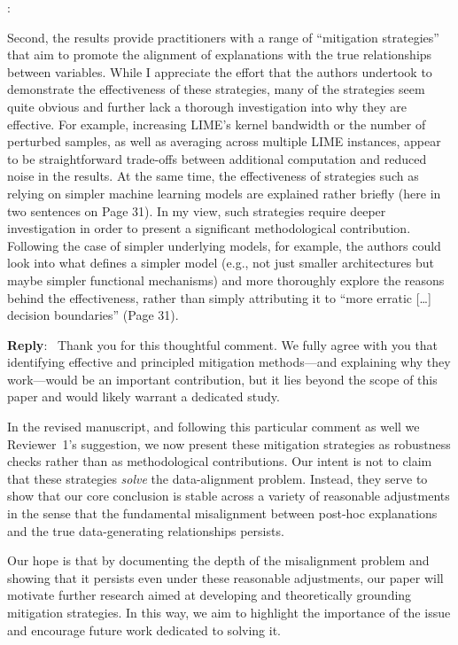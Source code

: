 \documentclass[11pt]{article}
\newcounter{se}[section]
\newcounter{reviewer}
\newcounter{point}[reviewer]
\renewcommand{\thepoint}{R\,\thereviewer.\arabic{point}}
\newenvironment{point}{
    \refstepcounter{point} \bigskip \noindent {\textbf{\thepoint}}: \rmfamily \itshape
}{\medskip}
\newenvironment{reply}
 {\par\medskip \noindent \begin{sf}\textbf{Reply}:\ }
 {\medskip \end{sf}}
\begin{document}
\begin{point}
Second, the results provide practitioners with a range of “mitigation strategies” that aim to promote the alignment of explanations with the true relationships between variables. While I appreciate the effort that the authors undertook to demonstrate the effectiveness of these strategies, many of the strategies seem quite obvious and further lack a thorough investigation into why they are effective. For example, increasing LIME’s kernel bandwidth or the number of perturbed samples, as well as averaging across multiple LIME instances, appear to be straightforward trade-offs between additional computation and reduced noise in the results. At the same time, the effectiveness of strategies such as relying on simpler machine learning models are explained rather briefly (here in two sentences on Page 31). In my view, such strategies require deeper investigation in order to present a significant methodological contribution. Following the case of simpler underlying models, for example, the authors could look into what defines a simpler model (e.g., not just smaller architectures but maybe simpler functional mechanisms) and more thoroughly explore the reasons behind the effectiveness, rather than simply attributing it to “more erratic […] decision boundaries” (Page 31). 
\end{point}

\begin{reply}
Thank you for this thoughtful comment.  We fully agree with you  that identifying effective and principled mitigation methods—and explaining why they work—would be an important contribution, but it lies beyond the scope of this paper and would likely warrant a dedicated study. 

In the revised manuscript, and following this particular comment as well we Reviewer~1’s suggestion, we now present these mitigation strategies as robustness checks rather than as methodological contributions. Our intent is not to claim that these strategies \emph{solve} the data-alignment problem. Instead, they serve to show that our core conclusion is stable across a variety of reasonable adjustments in the sense that the fundamental misalignment between post-hoc explanations and the true data-generating relationships persists.



Our hope is that by documenting the depth of the misalignment problem and showing that it persists even under these reasonable adjustments, our paper will motivate further research aimed at developing and theoretically grounding mitigation strategies. In this way, we aim to highlight the importance of the issue and encourage future work dedicated to solving it.
\end{reply}
\end{document}
